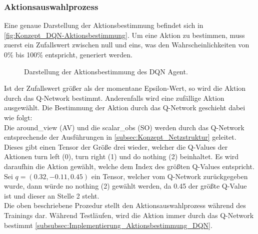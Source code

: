 \subsubsection{Aktionsauswahlprozess} \label{subsubsec:Konzept_Aktionsauswahlprozess_DQN}
Eine genaue Darstellung der Aktionsbestimmung befindet sich in \autoref{fig:Konzept_DQN-Aktionsbestimmung}. Um eine Aktion zu bestimmen, muss zuerst ein Zufallswert zwischen null und eins, was den Wahrscheinlichkeiten von 0\% bis 100\% entspricht, generiert werden.
\begin{figure}[H]
	\centering
	
	\caption[DQN Aktionsbestimmung]{Darstellung der Aktionsbestimmung des DQN Agent.}
	\label{fig:Konzept_DQN-Aktionsbestimmung}
\end{figure}
Ist der Zufallswert größer als der momentane Epsilon-Wert, so wird die Aktion durch das Q-Network bestimmt. Anderenfalls wird eine zufällige Aktion ausgewählt. Die Bestimmung der Aktion durch das Q-Network geschieht dabei wie folgt:\\
Die around\_view (AV) und die scalar\_obs (SO) werden durch das Q-Network entsprechende der Ausführungen in \autoref{subsec:Konzept_Netzstruktur} geleitet. Dieses gibt einen Tensor der Größe drei wieder, welcher die Q-Values der Aktionen turn left (0), turn right (1) und do nothing (2) beinhaltet.
Es wird daraufhin die Aktion gewählt, welche dem Index des größten Q-Values entspricht.\\
Sei $q = (0.32, -0.11, 0.45)$ ein Tensor, welcher vom Q-Network zurückgegeben wurde, dann würde no nothing (2) gewählt werden, da 0.45 der größte Q-Value ist und dieser an Stelle 2 steht.\\
Die oben beschriebene Prozedur stellt den Aktionsauswahlprozess während des Trainings dar. Während Testläufen, wird die Aktion immer durch das Q-Network bestimmt \autoref{subsubsec:Implementierung_Aktionsbestimmung_DQN}.

